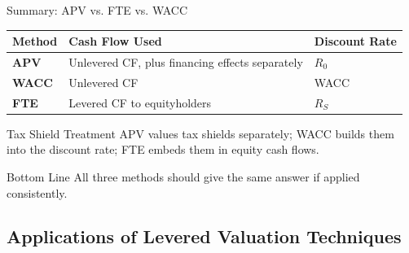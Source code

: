 \begin{frame}{Summary: APV vs. FTE vs. WACC}

\begin{table}
\centering
\begin{tabular}{p{2.4cm}p{5.0cm}p{3.0cm}}
\toprule
\textbf{Method} & \textbf{Cash Flow Used} & \textbf{Discount Rate} \\
\midrule
\textbf{APV}  & Unlevered CF, plus financing effects separately & $R_0$ \\
\textbf{WACC} & Unlevered CF & WACC \\
\textbf{FTE}  & Levered CF to equityholders & $R_S$ \\
\bottomrule
\end{tabular}
\end{table}

\vspace{0.4cm}

\begin{block}{Tax Shield Treatment}
APV values tax shields separately; WACC builds them into the discount rate;
FTE embeds them in equity cash flows.
\end{block}

\vfill

\begin{alertblock}{Bottom Line}
All three methods should give the same answer if applied consistently.
\end{alertblock}

\end{frame}

\subsection{Applications of Levered Valuation Techniques}
